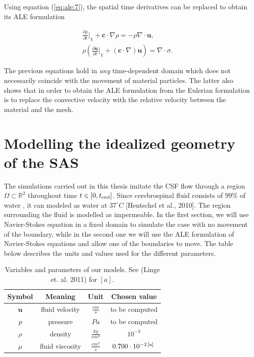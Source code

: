 \documentclass[a4paper,11pt,openright,twoside]{book}
\begin{document}
Using equation (\ref{eq:ale:7}), the spatial time derivatives can be replaced to obtain its ALE formulation

\begin{align}
\frac{\partial \rho}{\partial t} {\Big |}_\chi + \mathbf{c} \cdot \nabla \rho = - \rho \nabla \cdot \mathbf{u}, \\
\rho (\frac{\partial \mathbf{u}}{\partial t} {\Big |}_\chi + (\mathbf{c} \cdot \nabla)\mathbf{u}) = \nabla \cdot \sigma. 
\end{align}

The previous equations hold in \emph{any} time-dependent domain which does not necessarily coincide with the movement of material particles. The latter also shows that in order to obtain the ALE formulation from the Eulerian formulation is to replace the convective velocity with the relative velocity between the material and the mesh.

\newpage

\section{Modelling the idealized geometry of the SAS}



The simulations carried out in this thesis imitate the CSF flow through a region $\Omega \subset \mathbb{R}^2$ throughout time $t \in [0, t_{\rm end}]$. Since cerebrospinal fluid consists of $99 \% $ of water \cite{linge1}, it can modeled as water at $37^{\circ} C$ [Hentschel et al., 2010]. The region surrounding the fluid is modelled as impermeable.
In the first section, we will use Navier-Stokes equation in a fixed domain to simulate the case with no movement of the boundary, while in the second one we will use the ALE formulation of Navier-Stokes equations and allow one of the boundaries to move. The table below describes the units and values used for the different parameters.

\begin{table}[h!]
\begin{center}
\begin{tabular}{| c | c | c | c |}
\hline
\textbf{Symbol} & \textbf{Meaning} & \textbf{Unit} & \textbf{Chosen value} \\
\hline
$\mathbf{u}$ & fluid velocity & $\frac{cm}{s}$ & to be computed \\
\hline
$p$ & pressure & $Pa$ & to be computed \\
\hline
$\rho$ & density & $\frac{kg}{cm^3}$ & $10^{-3}$ \\
\hline
$\mu$ & fluid viscosity & $\frac{cm^2}{s}$ & $0.700 \cdot 10^{-2 \, [\rm a] \, }$ \\
\hline
\end{tabular}
\end{center}
\caption{Variables and parameters of our models. See (Linge et. al. 2011) for $[a]$.}
\end{table}
\end{document}
